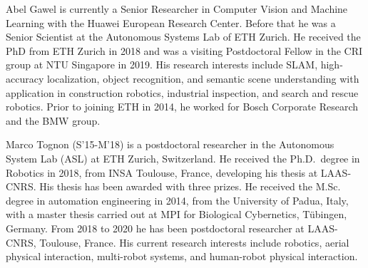 \documentclass[journal]{IEEEtran}  %
\begin{document}
\begin{IEEEbiography}{Abel Gawel} is currently a Senior Researcher in Computer Vision and Machine Learning with the Huawei European Research Center. Before that he was a Senior Scientist at the Autonomous Systems Lab of ETH Zurich. He received the PhD from ETH Zurich in 2018 and was a visiting Postdoctoral Fellow in the CRI group at NTU Singapore in 2019. His research interests include SLAM, high-accuracy localization, object recognition, and semantic scene understanding with application in construction robotics, industrial inspection, and search and rescue robotics. Prior to joining ETH in 2014, he worked for Bosch Corporate Research and the BMW group.
\end{IEEEbiography}

\begin{IEEEbiography}{Marco Tognon}
(S'15-M'18) is a postdoctoral researcher in the Autonomous System Lab (ASL) at ETH Zurich, Switzerland.
He received the Ph.D.~degree in Robotics in 2018, from INSA Toulouse, France, developing his thesis at LAAS-CNRS.
His thesis has been awarded with three prizes. 
He received the M.Sc. degree in automation engineering in 2014, from the University of Padua, Italy, with a master thesis carried out at MPI for Biological Cybernetics, T\"ubingen, Germany.
From 2018 to 2020 he has been postdoctoral researcher at LAAS-CNRS, Toulouse, France. 
His current research interests include robotics, aerial physical interaction, multi-robot systems, and human-robot physical interaction.
\end{IEEEbiography}
\end{document}
